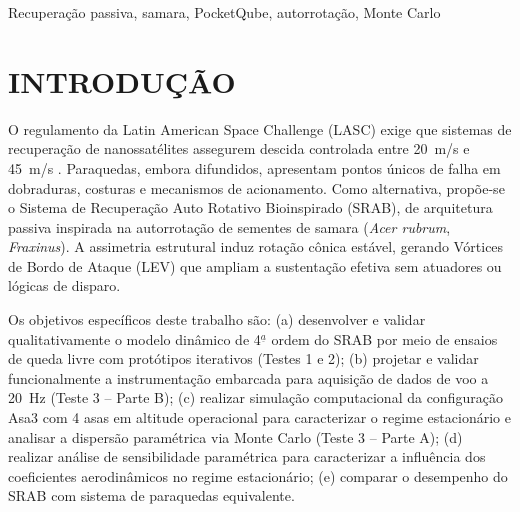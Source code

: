 \documentclass[12pt,fleqn]{article}
\renewcommand{\headrulewidth}{0pt}
\begin{document}
\begin{keywords}
Recuperação passiva, samara, PocketQube, autorrotação, Monte Carlo
\end{keywords}



\renewcommand{\headrulewidth}{0pt}


\rhead{}

\pagestyle{fancy}


\section{INTRODUÇÃO}

O regulamento da Latin American Space Challenge (LASC) exige que sistemas de recuperação de nanossatélites assegurem descida controlada entre 20~m/s e 45~m/s \citep{lasc2026}. Paraquedas, embora difundidos, apresentam pontos únicos de falha em dobraduras, costuras e mecanismos de acionamento. Como alternativa, propõe-se o Sistema de Recuperação Auto Rotativo Bioinspirado (SRAB), de arquitetura passiva inspirada na autorrotação de sementes de samara (\textit{Acer rubrum}, \textit{Fraxinus}). A assimetria estrutural induz rotação cônica estável, gerando Vórtices de Bordo de Ataque (LEV) que ampliam a sustentação efetiva \citep{lentink2009, mcconnell2023} sem atuadores ou lógicas de disparo.

Os objetivos específicos deste trabalho são: (a) desenvolver e validar qualitativamente o modelo dinâmico de 4$^{\underline{a}}$ ordem do SRAB por meio de ensaios de queda livre com protótipos iterativos (Testes 1 e 2); (b) projetar e validar funcionalmente a instrumentação embarcada para aquisição de dados de voo a 20~Hz (Teste 3 -- Parte B); (c) realizar simulação computacional da configuração Asa3 com 4 asas em altitude operacional para caracterizar o regime estacionário e analisar a dispersão paramétrica via Monte Carlo (Teste 3 -- Parte A); (d) realizar análise de sensibilidade paramétrica para caracterizar a influência dos coeficientes aerodinâmicos no regime estacionário; (e) comparar o desempenho do SRAB com sistema de paraquedas equivalente.
\end{document}
